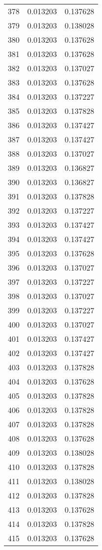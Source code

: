 \begin{longtable}{rrr}
378 & 0.013203 & 0.137628 \\
379 & 0.013203 & 0.138028 \\
380 & 0.013203 & 0.137628 \\
381 & 0.013203 & 0.137628 \\
382 & 0.013203 & 0.137027 \\
383 & 0.013203 & 0.137628 \\
384 & 0.013203 & 0.137227 \\
385 & 0.013203 & 0.137828 \\
386 & 0.013203 & 0.137427 \\
387 & 0.013203 & 0.137427 \\
388 & 0.013203 & 0.137027 \\
389 & 0.013203 & 0.136827 \\
390 & 0.013203 & 0.136827 \\
391 & 0.013203 & 0.137828 \\
392 & 0.013203 & 0.137227 \\
393 & 0.013203 & 0.137427 \\
394 & 0.013203 & 0.137427 \\
395 & 0.013203 & 0.137628 \\
396 & 0.013203 & 0.137027 \\
397 & 0.013203 & 0.137227 \\
398 & 0.013203 & 0.137027 \\
399 & 0.013203 & 0.137227 \\
400 & 0.013203 & 0.137027 \\
401 & 0.013203 & 0.137427 \\
402 & 0.013203 & 0.137427 \\
403 & 0.013203 & 0.137828 \\
404 & 0.013203 & 0.137628 \\
405 & 0.013203 & 0.137828 \\
406 & 0.013203 & 0.137828 \\
407 & 0.013203 & 0.137828 \\
408 & 0.013203 & 0.137628 \\
409 & 0.013203 & 0.138028 \\
410 & 0.013203 & 0.137828 \\
411 & 0.013203 & 0.138028 \\
412 & 0.013203 & 0.137828 \\
413 & 0.013203 & 0.137628 \\
414 & 0.013203 & 0.137828 \\
415 & 0.013203 & 0.137628 \\

\end{longtable}
